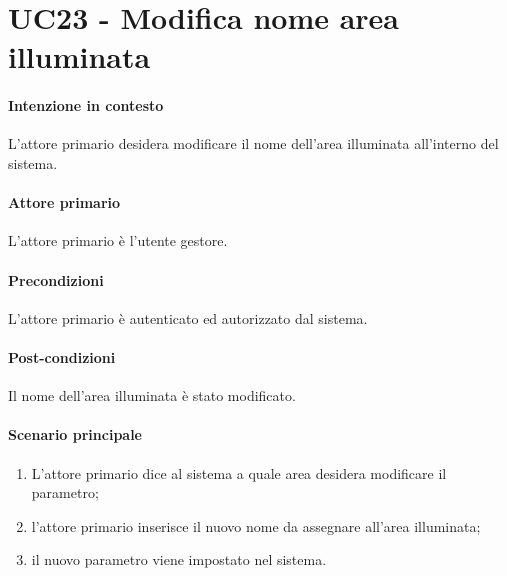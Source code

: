 \section{UC23 - Modifica nome area illuminata}\label{uc:23}
\paragraph{Intenzione in contesto} L'attore primario desidera modificare il nome dell'area illuminata all'interno del sistema.
\paragraph{Attore primario} L'attore primario è l'utente gestore.
\paragraph{Precondizioni}  L'attore primario è autenticato ed autorizzato dal sistema.
\paragraph{Post-condizioni} Il nome dell'area illuminata è stato modificato.
\paragraph{Scenario principale}
\begin{enumerate}
    \item L'attore primario dice al sistema a quale area desidera modificare il parametro;
    \item l'attore primario inserisce il nuovo nome da assegnare all'area illuminata;
    \item il nuovo parametro viene impostato nel sistema.
\end{enumerate}